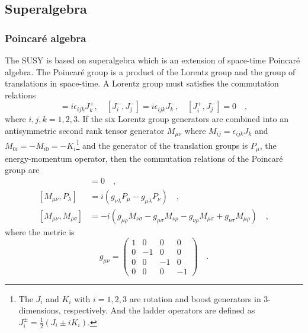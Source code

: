 
\subsection{Superalgebra}
\label{subsec:susy_superalgebra}


\subsubsection{Poincar\'{e} algebra}
\label{subsubsec:susy_poincare}
The SUSY is based on superalgebra which is an extension of space-time Poincar\'{e} algebra.
The Poincar\'{e} group is a product of the Lorentz group and the group of translations in space-time.
A Lorentz group must satisfies the commutation relations
%
\begin{equation}
    [J^{+}_{i}, J^{+}_{j}] = i \epsilon_{ijk} J^{+}_{k}, \quad 
    [J^{-}_{i}, J^{-}_{j}] = i \epsilon_{ijk} J^{-}_{k}, \quad 
    [J^{+}_{i}, J^{-}_{j}] = 0 \quad ,
    \label{eq:susy_Lorentz_commutation_relations}
\end{equation}
%
where $i, j, k = 1, 2, 3$.
If the six Lorentz group generators are combined into an antisymmetric second rank tensor generator $M_{\mu\nu}$ where $M_{ij} = \epsilon_{ijk}J_{k}$ and $M_{0i} = -M_{i0} = -K_{i}$\footnote{The $J_{i}$ and $K_{i}$ with $i=1,2,3$ are rotation and boost generators in 3-dimensions, respectively. And the ladder operators are defined as $J_{i}^{\pm} = \frac{1}{2} (J_{i} \pm i K_{i})$.} and the generator of the translation groups is $P_{\mu}$, the energy-momentum operator, then the commutation relations of the Poincar\'{e} group are
%
\begin{align}
    [P_{\mu}, P_{\nu}] &= 0 \quad ,\\
    [M_{\mu \nu}, P_{\lambda}] &= i (g_{\nu \lambda} P_{\mu} - g_{\mu \lambda} P_{\nu}) \quad ,\\
    [M_{\mu \nu}, M_{\rho \sigma}] &= -i (g_{\mu \rho} M_{\nu \sigma} - g_{\mu \sigma} M_{\nu \rho} - g_{\nu \rho} M_{\mu \sigma} + g_{\nu \sigma} M_{\mu \rho}) \quad ,
    \label{eq:susy_Poincare_commutation_relations}
\end{align}
%
where the metric is 
\begin{equation}
    g_{\mu \nu} =
    \left(
        \begin{array}{cccc}
            1 & 0  & 0  & 0\\
            0 & -1 & 0  & 0\\
            0 & 0  & -1 & 0\\
            0 & 0  & 0  & -1   
        \end{array}
    \right) \quad.
    \label{eq:susy_metric}
\end{equation}
%

